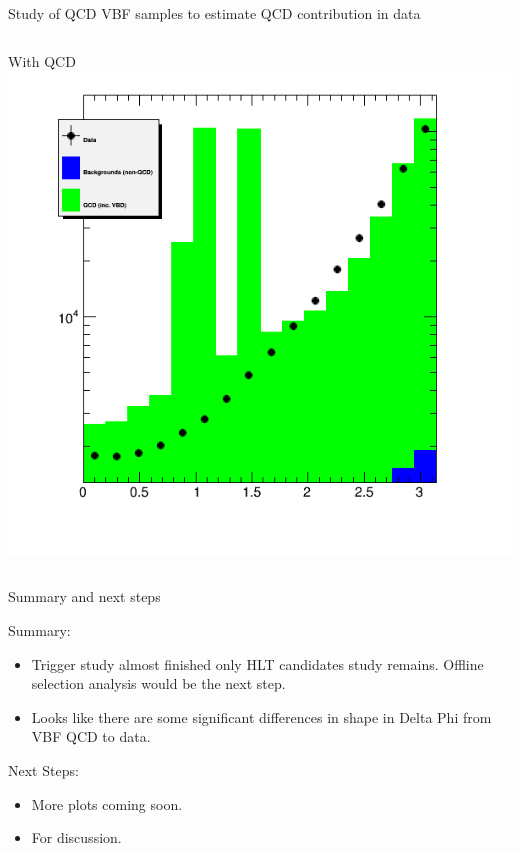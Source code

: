 \documentclass[8pt]{beamer}
\begin{document}
\begin{frame}{Study of QCD VBF samples to estimate QCD contribution in data}
\begin{columns}
\begin{block}{With QCD}
\includegraphics[width=\linewidth]{img/ctrl2_dphi.png}
 
\end{block}

\end{columns}

\end{frame}

\begin{frame}{Summary and next steps}
 
\begin{block}{Summary:}
 
\begin{itemize}
  \item Trigger study almost finished only HLT candidates study remains. Offline selection analysis would be the next step. 
  \item Looks like there are some significant differences in shape in Delta Phi from VBF QCD to data.
\end{itemize}

\end{block}

\begin{block}{Next Steps:}
 
\begin{itemize}
  \item More plots coming soon.
  \item For discussion.
\end{itemize}
 
\end{block}

\end{frame}
\end{document}
